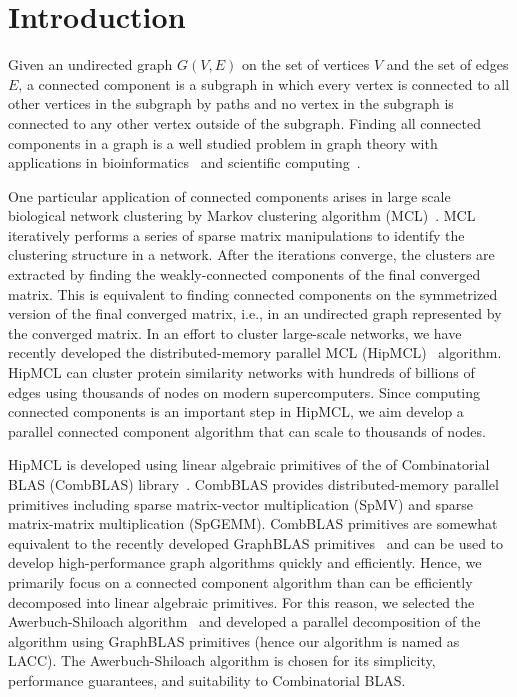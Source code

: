 \section{Introduction}
Given an undirected graph $G(V, E)$ on the set of vertices $V$ and the set of edges $E$, a connected component is a subgraph in which every vertex is connected to all other vertices in the subgraph by paths and no vertex in the subgraph is connected to any other vertex outside of the subgraph.  
Finding all connected components in a graph is a well studied problem in graph theory with applications in bioinformatics~\cite{van2000graph} and scientific computing~\cite{pothen1990computing, thornquist2009parallel}. 

One particular application of connected components arises in large scale biological network clustering by Markov clustering algorithm (MCL)~\cite{van2000graph}. 
MCL iteratively performs a series of sparse matrix manipulations to identify the clustering structure in a network. 
After the iterations converge, the clusters are extracted by finding the weakly-connected components of the final converged matrix.  This is equivalent to finding connected components on the symmetrized version of the final converged matrix, i.e., in an undirected graph represented by the converged matrix. 
In an effort to cluster large-scale networks, we have recently developed the distributed-memory parallel MCL (HipMCL)~\cite{hipmcl} algorithm.
HipMCL can cluster protein similarity networks with hundreds of billions of edges using thousands of nodes on modern supercomputers. 
Since computing connected components is an important step in HipMCL, we aim develop a parallel connected component algorithm that can scale to thousands of nodes. 

HipMCL is developed using linear algebraic primitives of the of Combinatorial BLAS (CombBLAS) library~\cite{bulucc2011combinatorial}. 
CombBLAS provides distributed-memory parallel primitives including sparse matrix-vector multiplication (SpMV) and sparse matrix-matrix multiplication (SpGEMM). 
CombBLAS primitives are somewhat equivalent to the recently developed GraphBLAS primitives~\cite{bulucc2017design} and can be used to develop high-performance graph algorithms quickly and efficiently. 
Hence, we primarily focus on a connected component algorithm than can be efficiently decomposed into linear algebraic primitives. 
For this reason, we selected the Awerbuch-Shiloach algorithm~\cite{awerbuch1987new} and developed a parallel decomposition of the algorithm using GraphBLAS primitives (hence our algorithm is named as LACC). The Awerbuch-Shiloach algorithm  is chosen for its simplicity, performance guarantees, and suitability to Combinatorial BLAS. 





